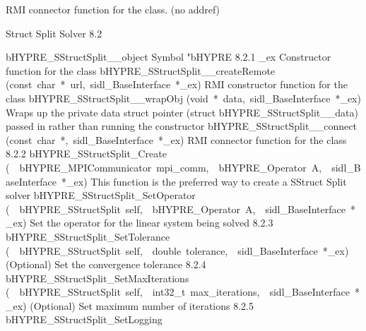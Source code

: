 \documentclass{article}
\begin{document}
\begin{cxxentry}
\begin{cxxentry}
\begin{cxxvariable}
\begin{cxxdoc}
RMI connector function for the class. (no addref)
\end{cxxdoc}
\end{cxxvariable}
\end{cxxentry}
\begin{cxxentry}
{}
        {Struct Split Solver}
        {}
        {
}
        {8.2}
\begin{cxxnames}
        {bHYPRE\_SStructSplit\_\_object}
        {}
        {
Symbol "bHYPRE}
        {8.2.1}
        {\_ex}
        {}
        {
Constructor function for the class}
        {}
\label{cxx.8.2.11}
        {bHYPRE\_SStructSplit\_\_createRemote}
        {(const\ char\ *\ url,\ sidl\_BaseInterface\ *\_ex)}
        {
RMI constructor function for the class}
        {}
\label{cxx.8.2.12}
        {bHYPRE\_SStructSplit\_\_wrapObj}
        {(void\ *\ data,\ sidl\_BaseInterface\ *\_ex)}
        {
Wraps up the private data struct pointer (struct bHYPRE\_SStructSplit\_\_data) passed in rather than running the constructor}
        {}
\label{cxx.8.2.13}
        {bHYPRE\_SStructSplit\_\_connect}
        {(const\ char\ *,\ sidl\_BaseInterface\ *\_ex)}
        {
RMI connector function for the class}
        {8.2.2}
        {bHYPRE\_SStructSplit\_Create}
        {(\ \ bHYPRE\_MPICommunicator\ mpi\_comm,\ \ bHYPRE\_Operator\ A,\ \ sidl\_BaseInterface\ *\_ex)}
        {
This function is the preferred way to create a SStruct Split solver}
        {}
\label{cxx.8.2.14}
        {bHYPRE\_SStructSplit\_SetOperator}
        {(\ \ bHYPRE\_SStructSplit\ self,\ \ bHYPRE\_Operator\ A,\ \ sidl\_BaseInterface\ *\_ex)}
        {
Set the operator for the linear system being solved}
        {8.2.3}
        {bHYPRE\_SStructSplit\_SetTolerance}
        {(\ \ bHYPRE\_SStructSplit\ self,\ \ double\ tolerance,\ \ sidl\_BaseInterface\ *\_ex)}
        {
(Optional) Set the convergence tolerance}
        {8.2.4}
        {bHYPRE\_SStructSplit\_SetMaxIterations}
        {(\ \ bHYPRE\_SStructSplit\ self,\ \ int32\_t\ max\_iterations,\ \ sidl\_BaseInterface\ *\_ex)}
        {
(Optional) Set maximum number of iterations}
        {8.2.5}
        {bHYPRE\_SStructSplit\_SetLogging}

\end{cxxnames}
\end{cxxentry}
\end{cxxentry}
\end{document}

